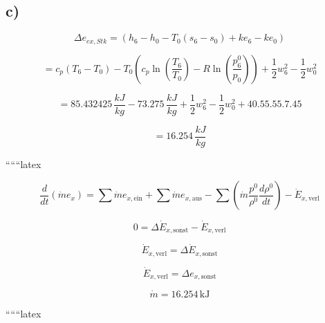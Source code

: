 

\subsection*{c)}

\[
\Delta e_{ex,Stk} = (h_6 - h_0 - T_0 (s_6 - s_0) + ke_6 - ke_0)
\]

\[
= c_p (T_6 - T_0) - T_0 \left( c_p \ln \left( \frac{T_6}{T_0} \right) - R \ln \left( \frac{p_6^0}{p_0} \right) \right) + \frac{1}{2} w_6^2 - \frac{1}{2} w_0^2
\]

\[
= 85.432425 \, \frac{kJ}{kg} - 73.275 \, \frac{kJ}{kg} + \frac{1}{2} w_6^2 - \frac{1}{2} w_0^2 + 40.55.55.7.45
\]

\[
= 16.254 \, \frac{kJ}{kg}
\]

``````latex

\[
\frac{d}{d t} \left( \dot{m} e_x \right) = \sum \dot{m} e_{x, \text{ein}} + \sum \dot{m} e_{x, \text{aus}} - \sum \left( \dot{m} \frac{p^0}{\rho^0} \frac{d \rho^0}{d t} \right) - \dot{E}_{x, \text{verl}}
\]

\[
0 = \Delta \dot{E}_{x, \text{sonst}} - \dot{E}_{x, \text{verl}}
\]

\[
\dot{E}_{x, \text{verl}} = \Delta \dot{E}_{x, \text{sonst}}
\]

\[
\dot{E}_{x, \text{verl}} = \Delta e_{x, \text{sonst}}
\]

\[
\dot{m} = 16.254 \, \text{kJ}
\]

``````latex